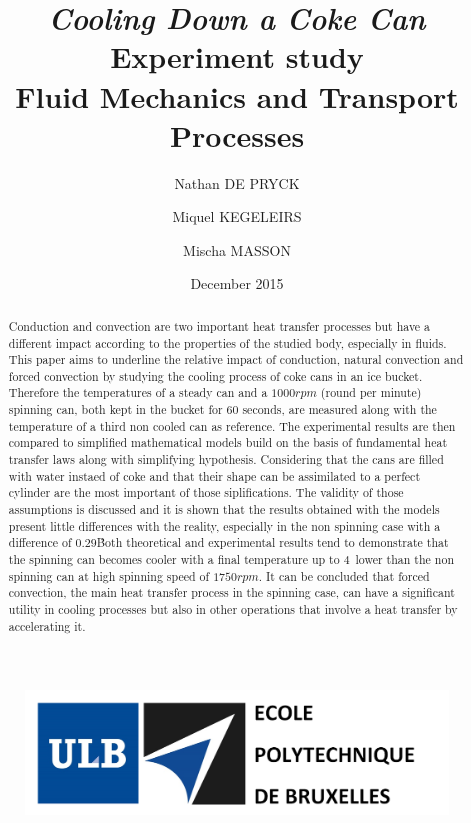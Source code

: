 \documentclass{report}
\title{\Huge\emph{Cooling Down a Coke Can}\\
	\LARGE Experiment study\\
	\vspace{11pt}
	\large Fluid Mechanics and Transport Processes}
\date{December 2015}
\author{Nathan DE PRYCK \and Miquel KEGELEIRS \and Mischa MASSON}
\begin{document}
	
	\begin{figure}[t]
		\includegraphics[width=15cm]{img/entete.PNG}
	\end{figure}
	
	\maketitle
	
	\renewcommand{\abstractname}{``Cooling down a coke can'' \\Experiment study by Nathan De Pryck, Miquel Kegeleirs and Mischa Masson\\ Université Libre de Bruxelles\\2015-2016.}
	
	\BgThispage
	
	\begin{abstract}
	
	Conduction and convection are two important heat transfer processes but have a different impact according to the properties of the studied body, especially in fluids. 
	This paper aims to underline the relative impact of conduction, natural convection and forced convection by studying the cooling process of coke cans in an ice bucket.
	Therefore the temperatures of a steady can and a $1000rpm$ (round per minute) spinning can, both kept in the bucket for 60 seconds, are measured along with the temperature of a third non cooled can as reference.
	The experimental results are then compared to simplified mathematical models build on the basis of fundamental heat transfer laws along with simplifying hypothesis.
	Considering that the cans are filled with water instaed of coke and that their shape can be assimilated to a perfect cylinder are the most important of those siplifications.
	The validity of those assumptions is discussed and it is shown that the results obtained with the models present little differences with the reality, especially in the non spinning case with a difference of $0.29$\textcelsius\.
	Both theoretical and experimental results tend to demonstrate that the spinning can becomes cooler with a final temperature up to $4$\textcelsius\ lower than the non spinning can at high spinning speed of $1750rpm$.
	It can be concluded that forced convection, the main heat transfer process in the spinning case, can have a significant utility in cooling processes but also in other operations that involve a heat transfer by accelerating it.
	
	\end{abstract}
	
\end{document}
